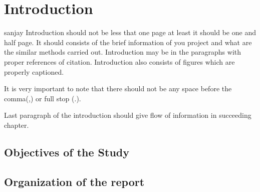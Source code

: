 
\chapter{Introduction}
sanjay
Introduction should not be less that one page at least it should be one and half page. It should consists of the brief information of you project and what are the similar methods carried out. Introduction may be in the paragraphs with proper references of citation. Introduction also consists of figures which are properly captioned. 
\par It is very important to note that there should not be any space before the comma(,) or full stop (.). 
\par Last paragraph of the introduction should give flow of information in succeeding chapter.  

\section{Objectives of the Study}

\section{Organization of the report}
